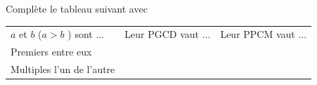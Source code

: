 %
%
Complète le tableau suivant avec %
    \begin{tabular}{lll}
        $a$ et $b$ ($a > b$ ) sont ... & Leur PGCD vaut ... & Leur PPCM vaut ... \\
        Premiers entre eux                  &                    &                    \\
        Multiples l'un de l'autre           &                    &
    \end{tabular}%
